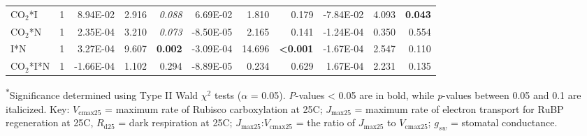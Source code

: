\begin{landscape}
\begin{table}
{\begin{tabular}{p{3cm}p{0.5cm}p{1.75cm}p{1.5cm}p{1.5cm}p{1.75cm}p{1.5cm}p{1.5cm}p{1.75cm}p{1.5cm}p{1.5cm}}
            CO$_2$*I & \multicolumn{1}{r}{1}
            & \multicolumn{1}{r}{ 8.94E-02}     & \multicolumn{1}{r}{2.916}         & \multicolumn{1}{r}{\textit{0.088}}
            & \multicolumn{1}{r}{ 6.69E-02}     & \multicolumn{1}{r}{1.810}         & \multicolumn{1}{r}{0.179}
            & \multicolumn{1}{r}{-7.84E-02}     & \multicolumn{1}{r}{4.093}         & \multicolumn{1}{r}{\textbf{0.043}} 
            \\

            CO$_2$*N & \multicolumn{1}{r}{1}
            & \multicolumn{1}{r}{ 2.35E-04}     & \multicolumn{1}{r}{3.210}         & \multicolumn{1}{r}{\textit{0.073}}
            & \multicolumn{1}{r}{-8.50E-05}     & \multicolumn{1}{r}{2.165}         & \multicolumn{1}{r}{0.141}
            & \multicolumn{1}{r}{-1.24E-04}     & \multicolumn{1}{r}{0.350}         & \multicolumn{1}{r}{0.554} 
            \\

            I*N & \multicolumn{1}{r}{1}
            & \multicolumn{1}{r}{ 3.27E-04}     & \multicolumn{1}{r}{9.607}         & \multicolumn{1}{r}{\textbf{0.002}}
            & \multicolumn{1}{r}{-3.09E-04}     & \multicolumn{1}{r}{14.696}        & \multicolumn{1}{r}{\textbf{<0.001}}
            & \multicolumn{1}{r}{-1.67E-04}     & \multicolumn{1}{r}{2.547}         & \multicolumn{1}{r}{0.110} 
            \\

            CO$_2$*I*N & \multicolumn{1}{r}{1}
            & \multicolumn{1}{r}{-1.66E-04}     & \multicolumn{1}{r}{1.102}         & \multicolumn{1}{r}{0.294}
            & \multicolumn{1}{r}{-8.89E-05}     & \multicolumn{1}{r}{0.234}         & \multicolumn{1}{r}{0.629}
            & \multicolumn{1}{r}{ 1.67E-04}     & \multicolumn{1}{r}{2.231}         & \multicolumn{1}{r}{0.135} 
            \\
            \hline
    \end{tabular}}
    \label{tab:table5.2}
    \end{table}
\begin{singlespace}
\noindent \textsuperscript{$*$}Significance determined using Type II Wald $\chi^{2}$ tests ($\alpha$ = 0.05). \textit{P}-values < 0.05 are in bold, while \textit{p}-values between 0.05 and 0.1 are italicized. Key: $V_\mathrm{cmax25}$ = maximum rate of Rubisco carboxylation at 25\textdegree{}C; $J_\mathrm{max25}$ = maximum rate of electron transport for RuBP regeneration at 25\textdegree{}C, $R_\mathrm{d25}$ = dark respiration at 25\textdegree{}C; $J_{\mathrm{max25}}$:$V_\mathrm{cmax25}$ = the ratio of $J_\mathrm{max25}$ to $V_\mathrm{cmax25}$; $g_{sw}$ = stomatal conductance.
\end{singlespace}
\end{landscape}
\clearpage

